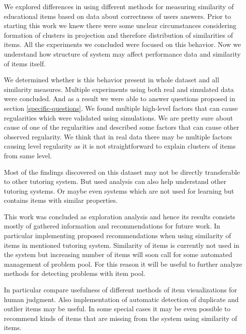 \documentclass[
  digital, %
  table,   %
  nolof,     %
  nolot,     %
  nocover,
  color,
  final, %
]{fithesis3}
\begin{document}

We explored differences in using different methods for measuring similarity of educational items based on data about correctness of users answers. Prior to starting this work we knew there were some unclear circumstances considering formation of clusters in projection and therefore distribution of similarities of items. All the experiments we concluded were focused on this behavior. Now we understand how structure of system may affect performance data and similarity of items itself.

We determined whether is this behavior present in whole dataset and all similarity measures. Multiple experiments using both real and simulated data were concluded. And as a result we were able to answer questions proposed in section \ref{specific-questions}. We found multiple high-level factors that can cause regularities which were validated using simulations. We are pretty sure about cause of one of the regularities and described some factors that can cause other observed regularity. We think that in real data there may be multiple factors causing level regularity as it is not straightforward to explain clusters of items from same level.

Most of the findings discovered on this dataset may not be directly transferable to other tutoring system. But used analysis can also help understand other tutoring systems. Or maybe even systems which are not used for learning but contains items with similar properties.


This work was concluded as exploration analysis and hence its results consists mostly of gathered information and recommendations for future work. In particular implementing proposed recommendations when using similarity of items in mentioned tutoring system. Similarity of items is currently not used in the system \umimeCesky{} but increasing number of items will soon call for some automated management of problem pool. For this reason it will be useful to further analyze methods for detecting problems with item pool.

In particular compare usefulness of different methods of item visualizations for human judgment. Also implementation of automatic detection of duplicate and outlier items may be useful. In some special cases it may be even possible to recommend kinds of items that are missing from the system using similarity of items.




\makeatletter\thesis@blocks@clear\makeatother

\end{document}
